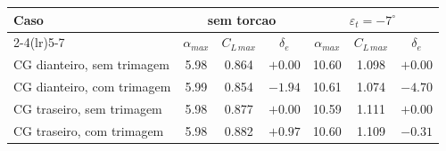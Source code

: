 \begin{tabular}{lcccccc}
\toprule
Caso & \multicolumn{3}{c}{sem torcao} & \multicolumn{3}{c}{$\varepsilon_t = -7^\circ$} \\
\cmidrule(lr){2-4}\cmidrule(lr){5-7}
& $\alpha_{max}$ & $C_{L\,max}$ & $\delta_e$ & $\alpha_{max}$ & $C_{L\,max}$ & $\delta_e$ \\
\midrule
CG dianteiro, sem trimagem & 5.98 & 0.864 & $+0.00$ & 10.60 & 1.098 & $+0.00$ \\
CG dianteiro, com trimagem & 5.99 & 0.854 & $-1.94$ & 10.61 & 1.074 & $-4.70$ \\
CG traseiro, sem trimagem & 5.98 & 0.877 & $+0.00$ & 10.59 & 1.111 & $+0.00$ \\
CG traseiro, com trimagem & 5.98 & 0.882 & $+0.97$ & 10.60 & 1.109 & $-0.31$ \\
\bottomrule
\end{tabular}
